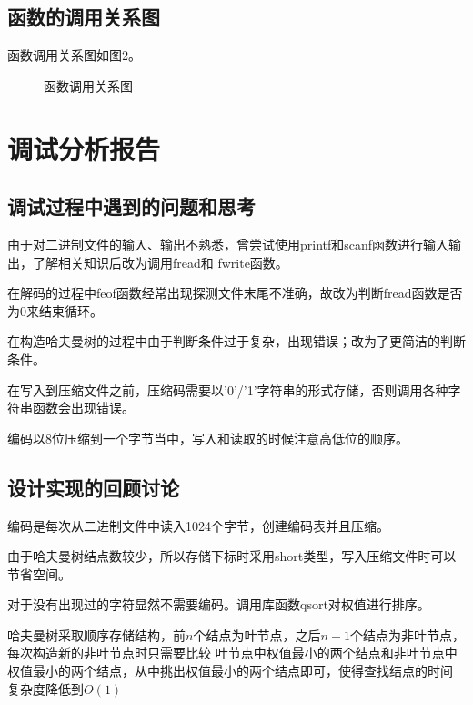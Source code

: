 \documentclass{article}
\begin{document}
\subsection{函数的调用关系图}

函数调用关系图如图2。

\begin{figure}[htbp]


    \caption{函数调用关系图}

\end{figure}

\section{调试分析报告}

\subsection{调试过程中遇到的问题和思考}

由于对二进制文件的输入、输出不熟悉，曾尝试使用printf和scanf函数进行输入输出，了解相关知识后改为调用fread和
fwrite函数。

在解码的过程中feof函数经常出现探测文件末尾不准确，故改为判断fread函数是否为0来结束循环。

在构造哈夫曼树的过程中由于判断条件过于复杂，出现错误；改为了更简洁的判断条件。

在写入到压缩文件之前，压缩码需要以'0'/'1'字符串的形式存储，否则调用各种字符串函数会出现错误。

编码以8位压缩到一个字节当中，写入和读取的时候注意高低位的顺序。

\subsection{设计实现的回顾讨论}

编码是每次从二进制文件中读入1024个字节，创建编码表并且压缩。

由于哈夫曼树结点数较少，所以存储下标时采用short类型，写入压缩文件时可以节省空间。

对于没有出现过的字符显然不需要编码。调用库函数qsort对权值进行排序。

哈夫曼树采取顺序存储结构，前$n$个结点为叶节点，之后$n-1$个结点为非叶节点，每次构造新的非叶节点时只需要比较
叶节点中权值最小的两个结点和非叶节点中权值最小的两个结点，从中挑出权值最小的两个结点即可，使得查找结点的时间
复杂度降低到$O(1)$
\end{document}
